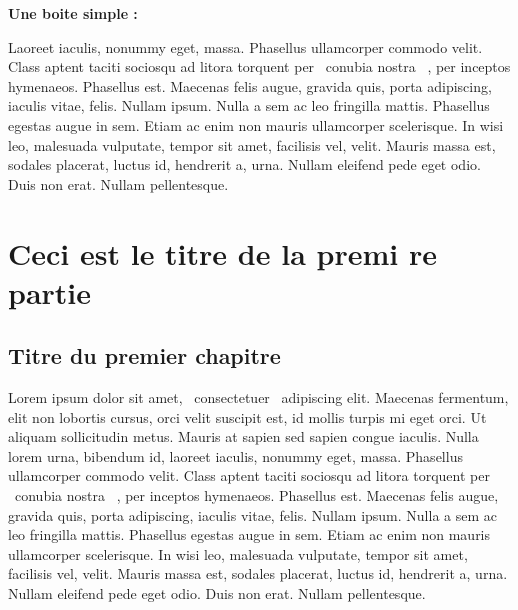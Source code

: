 \documentclass{article}
\begin{document}
\textbf{Une boite simple : }

Laoreet iaculis, nonummy eget, massa. Phasellus ullamcorper commodo velit. Class aptent taciti sociosqu ad litora torquent per  ~conubia nostra~ , per inceptos hymenaeos. Phasellus est. Maecenas felis augue, gravida quis, porta adipiscing, iaculis vitae, felis. Nullam ipsum. Nulla a sem ac leo fringilla mattis. Phasellus egestas augue in sem. Etiam ac enim non mauris ullamcorper scelerisque. In wisi leo, malesuada vulputate, tempor sit amet, facilisis vel, velit. Mauris massa est, sodales placerat, luctus id, hendrerit a, urna. Nullam eleifend pede eget odio. Duis non erat. Nullam pellentesque.


\clearemptydoublepage
{}

\clearemptydoublepage


\clearemptydoublepage
\part{Ceci est le titre de la premi re partie}



\clearemptydoublepage
\chapter{Titre du premier chapitre}

Lorem ipsum dolor sit amet,  ~consectetuer~  adipiscing elit. Maecenas fermentum, elit non lobortis cursus, orci velit suscipit est, id mollis turpis mi eget orci. Ut aliquam sollicitudin metus. Mauris at sapien sed sapien congue iaculis. Nulla lorem urna, bibendum id, laoreet iaculis, nonummy eget, massa. Phasellus ullamcorper commodo velit. Class aptent taciti sociosqu ad litora torquent per  ~conubia nostra~ , per inceptos hymenaeos. Phasellus est. Maecenas felis augue, gravida quis, porta adipiscing, iaculis vitae, felis. Nullam ipsum. Nulla a sem ac leo fringilla mattis. Phasellus egestas augue in sem. Etiam ac enim non mauris ullamcorper scelerisque. In wisi leo, malesuada vulputate, tempor sit amet, facilisis vel, velit. Mauris massa est, sodales placerat, luctus id, hendrerit a, urna. Nullam eleifend pede eget odio. Duis non erat. Nullam pellentesque.
\end{document}
